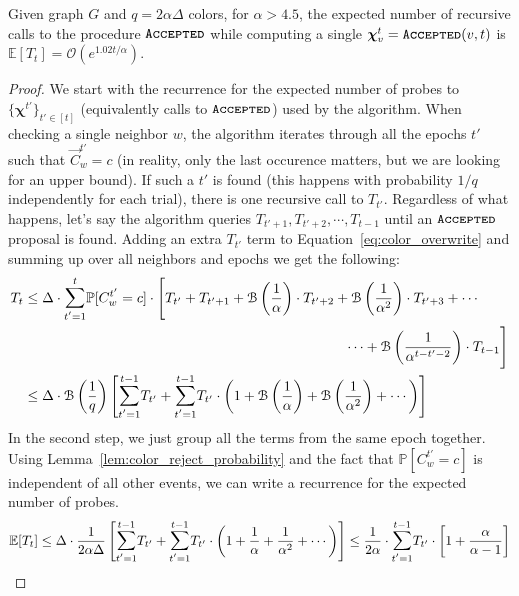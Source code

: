 \begin{lemma}
\label{lem:coloring_recurrence}
Given graph $G$ and $q=2\alpha\Delta$ colors, for $\alpha > 4.5$, the expected number of recursive calls to the procedure $\texttt{\textsc{Accepted}}$
while computing a single $\bm\chi^t_v = \texttt{\textsc{Accepted}}(v,t)$ is $\mathbb E[T_t] = \mathcal{O}\left(e^{1.02t/\alpha}\right)$.
\end{lemma}
\begin{proof}
We start with the recurrence for the expected number of probes to $\{\bm\chi^{t'}\}_{t'\in[t]}$
(equivalently calls to $\texttt{\textsc{Accepted}}$) used by the algorithm.
When checking a single neighbor $w$, the algorithm iterates through all the epochs $t'$ such that $\vec C^{t'}_w = c$
(in reality, only the last occurence matters, but we are looking for an upper bound).
If such a $t'$ is found (this happens with probability $1/q$ independently for each trial), there is one recursive call to $T_{t'}$.
Regardless of what happens, let's say the algorithm queries $T_{t'+1}, T_{t'+2}, \cdots, T_{t-1}$ until an $\texttt{\textsc{Accepted}}$ proposal is found.
Adding an extra $T_{t'}$ term to Equation~\ref{eq:color_overwrite} and summing up over all neighbors and epochs we get the following:
\begin{align}
T_{t} &\le \Delta \cdot \mathlarger\sum\limits_{t'=1}^{t} \mathbb P[C^{t'}_w = c]\cdot
\Biggl[ T_{t'} + T_{t'+1} + \mathcal B\left(\frac{1}{\alpha}\right)\cdot T_{t'+2}
+ \mathcal B\left(\frac{1}{\alpha^2}\right)\cdot T_{t'+3} + \cdots\\
&\hspace{23em}
\cdots + \mathcal B\left(\frac{1}{\alpha^{t-t'-2}}\right)\cdot T_{t-1} \Biggr]\\
&\le \Delta\cdot\mathcal B\left( \frac{1}{q}\right) \Biggl[
\mathlarger\sum\limits_{t'=1}^{t-1} T_{t'} +
\mathlarger\sum\limits_{t'=1}^{t-1} T_{t'}\cdot \left(1 + \mathcal B\left(\frac1\alpha\right) + \mathcal B\left(\frac1{\alpha^2}\right) + \cdots\right)
\Biggr]
\end{align}
In the second step, we just group all the terms from the same epoch together.
Using Lemma~\ref{lem:color_reject_probability} and the fact that $\mathbb P[C^{t'}_w = c]$ is independent of all other events,
we can write a recurrence for the expected number of probes.
\begin{align}
\mathbb E[T_t] \le \Delta\cdot\frac{1}{2\alpha\Delta}
\left[
\mathlarger\sum\limits_{t'=1}^{t-1} T_{t'} + \mathlarger\sum\limits_{t'=1}^{t-1} T_{t'}\cdot \left(1 + \frac1\alpha + \frac1{\alpha^2} + \cdots\right)
\right]
\le \frac{1}{2\alpha}\cdot \mathlarger\sum\limits_{t'=1}^{t-1} T_{t'}\cdot \left[1 + \frac{\alpha}{\alpha-1} \right]

\end{align}
\end{proof}
